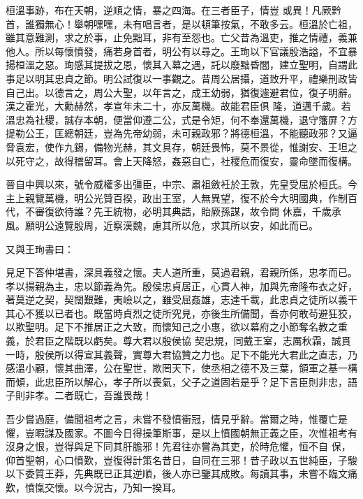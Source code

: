 \begin{pinyinscope}
 桓溫事跡，布在天朝，逆順之情，暴之四海。在三者臣子，情豈
 或異！凡厥黔首，誰獨無心！舉朝嘿嘿，未有唱言者，是以頓筆按氣，不敢多云。桓溫於亡祖，雖其意難測，求之於事，止免黜耳，非有至怨也。亡父昔為溫吏，推之情禮，義兼他人。所以每懷憤發，痛若身首者，明公有以尋之。王珣以下官議殷浩謚，不宜暴揚桓溫之惡。珣感其提拔之恩，懷其入幕之遇，託以廢黜昏闇，建立聖明，自謂此事足以明其忠貞之節。明公試復以一事觀之。昔周公居攝，道致升平，禮樂刑政皆自己出。以德言之，周公大聖，以年言之，成王幼弱，猶復遽避君位，復子明辭。漢之霍光，大勳赫然，孝宣年未二十，亦反萬機。故能君臣俱
 隆，道邁千歲。若溫忠為社稷，誠存本朝，便當仰遵二公，式是令矩，何不奉還萬機，退守籓屏？方提勒公王，匡總朝廷，豈為先帝幼弱，未可親政邪？將德桓溫，不能聽政邪？又逼脅袁宏，使作九錫，備物光赫，其文具存，朝廷畏怖，莫不景從，惟謝安、王坦之以死守之，故得稽留耳。會上天降怒，姦惡自亡，社稷危而復安，靈命墜而復構。



 晉自中興以來，號令威權多出彊臣，中宗、肅祖斂衽於王敦，先皇受屈於桓氏。今主上親覽萬機，明公光贊百揆，政出王室，人無異望，復不於今大明國典，作制百代，不審復欲待誰？先王統物，必明其典誥，貽厥孫謀，故令問
 休嘉，千歲承風。願明公遠覽殷周，近察漢魏，慮其所以危，求其所以安，如此而已。



 又與王珣書曰：



 見足下答仲堪書，深具義發之懷。夫人道所重，莫過君親，君親所係，忠孝而已。孝以揚親為主，忠以節義為先。殷侯忠貞居正，心貫人神，加與先帝隆布衣之好，著莫逆之契，契闊艱難，夷嶮以之，雖受屈姦雄，志達千載，此忠貞之徒所以義干其心不獲以已者也。既當時貞烈之徒所究見，亦後生所備聞，吾亦何敢茍避狂狡，以欺聖明。足下不推居正之大致，而懷知己之小惠，欲以幕府之小節奪名教之重義，於君臣之階既以虧矣。尊大君以殷侯協
 契忠規，同戴王室，志厲秋霜，誠貫一時，殷侯所以得宣其義聲，實尊大君協贊之力也。足下不能光大君此之直志，乃感溫小顧，懷其曲澤，公在聖世，欺罔天下，使丞相之德不及三葉，領軍之基一構而傾，此忠臣所以解心，孝子所以喪氣，父子之道固若是乎？足下言臣則非忠，語子則非孝。二者既亡，吾誰畏哉！



 吾少嘗過庭，備聞祖考之言，未嘗不發憤衝冠，情見乎辭。當爾之時，惟覆亡是懼，豈暇謀及國家。不圖今日得操筆斯事，是以上憤國朝無正義之臣，次惟祖考有沒身之恨，豈得與足下同其肝膽邪！先君往亦嘗為其吏，於時危懼，恒不自
 保，仰首聖朝，心口憤歎，豈復得計策名昔日，自同在三邪！昔子政以五世純臣，子駿以下委質王莽，先典既已正其逆順，後人亦已鑒其成敗。每讀其事，未嘗不臨文痛歎，憤愾交懷。以今況古，乃知一揆耳。




\end{pinyinscope}
